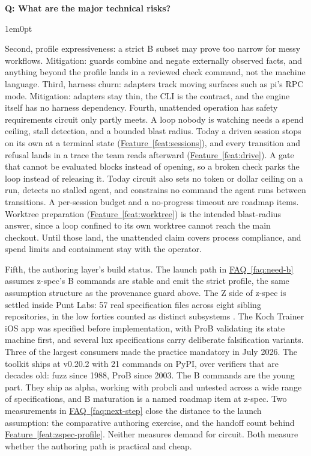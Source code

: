 \documentclass[11pt,letterpaper]{article}
\newcounter{faqnum}
\newenvironment{faqpair}[1]{%
  \needspace{4\baselineskip}%
  \vspace{0.5em}%
  \refstepcounter{faqnum}%
  \noindent\textbf{\color{SectionBlue}Q\thefaqnum: #1}\par\nopagebreak[4]%
  \vspace{0.2em}%
  \begin{adjustwidth}{1em}{0pt}%
  \setlength{\parindent}{0pt}%
}{%
  \end{adjustwidth}%
  \vspace{0.5em}%
}
\newcommand{\faqref}[1]{\hyperref[#1]{FAQ~\ref*{#1}}}
\newcommand{\featureref}[1]{\hyperref[#1]{Feature~\ref*{#1}}}
\begin{document}
\begin{faqpair}{What are the major technical risks?}
  Second, profile expressiveness: a strict B subset may prove too narrow for messy workflows. Mitigation: guards combine and negate externally observed facts, and anything beyond the profile lands in a reviewed check command, not the machine language. Third, harness churn: adapters track moving surfaces such as pi's RPC mode. Mitigation: adapters stay thin, the CLI is the contract, and the engine itself has no harness dependency. Fourth, unattended operation has safety requirements circuit only partly meets. A loop nobody is watching needs a spend ceiling, stall detection, and a bounded blast radius. Today a driven session stops on its own at a terminal state (\featureref{feat:sessions}), and every transition and refusal lands in a trace the team reads afterward (\featureref{feat:drive}). A gate that cannot be evaluated blocks instead of opening, so a broken check parks the loop instead of releasing it. Today circuit also sets no token or dollar ceiling on a run, detects no stalled agent, and constrains no command the agent runs between transitions. A per-session budget and a no-progress timeout are roadmap items. Worktree preparation (\featureref{feat:worktree}) is the intended blast-radius answer, since a loop confined to its own worktree cannot reach the main checkout. Until those land, the unattended claim covers process compliance, and spend limits and containment stay with the operator.

  Fifth, the authoring layer's build status. The launch path in \faqref{faq:need-b} assumes z-spec's B commands are stable and emit the strict profile, the same assumption structure as the provenance guard above. The Z side of z-spec is settled inside Punt Labs: 57 real specification files across eight sibling repositories, in the low forties counted as distinct subsystems \cite{zspecprfaq2026}. The Koch Trainer iOS app was specified before implementation, with ProB validating its state machine first, and several lux specifications carry deliberate falsification variants. Three of the largest consumers made the practice mandatory in July 2026. The toolkit ships at v0.20.2 with 21 commands on PyPI, over verifiers that are decades old: fuzz since 1988, ProB since 2003. The B commands are the young part. They ship as alpha, working with probcli and untested across a wide range of specifications, and B maturation is a named roadmap item at z-spec. Two measurements in \faqref{faq:next-step} close the distance to the launch assumption: the comparative authoring exercise, and the handoff count behind \featureref{feat:zspec-profile}. Neither measures demand for circuit. Both measure whether the authoring path is practical and cheap.
\end{faqpair}
\end{document}
